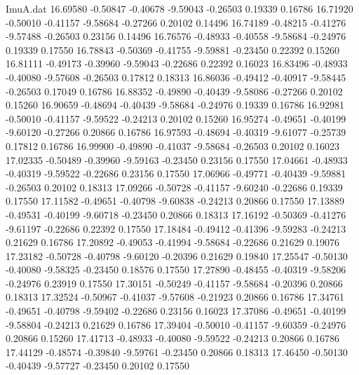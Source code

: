 \begin{filecontents}{ImuA.dat}
  16.69580   -0.50847   -0.40678   -9.59043   -0.26503    0.19339    0.16786
  16.71920   -0.50010   -0.41157   -9.58684   -0.27266    0.20102    0.14496
  16.74189   -0.48215   -0.41276   -9.57488   -0.26503    0.23156    0.14496
  16.76576   -0.48933   -0.40558   -9.58684   -0.24976    0.19339    0.17550
  16.78843   -0.50369   -0.41755   -9.59881   -0.23450    0.22392    0.15260
  16.81111   -0.49173   -0.39960   -9.59043   -0.22686    0.22392    0.16023
  16.83496   -0.48933   -0.40080   -9.57608   -0.26503    0.17812    0.18313
  16.86036   -0.49412   -0.40917   -9.58445   -0.26503    0.17049    0.16786
  16.88352   -0.49890   -0.40439   -9.58086   -0.27266    0.20102    0.15260
  16.90659   -0.48694   -0.40439   -9.58684   -0.24976    0.19339    0.16786
  16.92981   -0.50010   -0.41157   -9.59522   -0.24213    0.20102    0.15260
  16.95274   -0.49651   -0.40199   -9.60120   -0.27266    0.20866    0.16786
  16.97593   -0.48694   -0.40319   -9.61077   -0.25739    0.17812    0.16786
  16.99900   -0.49890   -0.41037   -9.58684   -0.26503    0.20102    0.16023
  17.02335   -0.50489   -0.39960   -9.59163   -0.23450    0.23156    0.17550
  17.04661   -0.48933   -0.40319   -9.59522   -0.22686    0.23156    0.17550
  17.06966   -0.49771   -0.40439   -9.59881   -0.26503    0.20102    0.18313
  17.09266   -0.50728   -0.41157   -9.60240   -0.22686    0.19339    0.17550
  17.11582   -0.49651   -0.40798   -9.60838   -0.24213    0.20866    0.17550
  17.13889   -0.49531   -0.40199   -9.60718   -0.23450    0.20866    0.18313
  17.16192   -0.50369   -0.41276   -9.61197   -0.22686    0.22392    0.17550
  17.18484   -0.49412   -0.41396   -9.59283   -0.24213    0.21629    0.16786
  17.20892   -0.49053   -0.41994   -9.58684   -0.22686    0.21629    0.19076
  17.23182   -0.50728   -0.40798   -9.60120   -0.20396    0.21629    0.19840
  17.25547   -0.50130   -0.40080   -9.58325   -0.23450    0.18576    0.17550
  17.27890   -0.48455   -0.40319   -9.58206   -0.24976    0.23919    0.17550
  17.30151   -0.50249   -0.41157   -9.58684   -0.20396    0.20866    0.18313
  17.32524   -0.50967   -0.41037   -9.57608   -0.21923    0.20866    0.16786
  17.34761   -0.49651   -0.40798   -9.59402   -0.22686    0.23156    0.16023
  17.37086   -0.49651   -0.40199   -9.58804   -0.24213    0.21629    0.16786
  17.39404   -0.50010   -0.41157   -9.60359   -0.24976    0.20866    0.15260
  17.41713   -0.48933   -0.40080   -9.59522   -0.24213    0.20866    0.16786
  17.44129   -0.48574   -0.39840   -9.59761   -0.23450    0.20866    0.18313
  17.46450   -0.50130   -0.40439   -9.57727   -0.23450    0.20102    0.17550

\end{filecontents}
